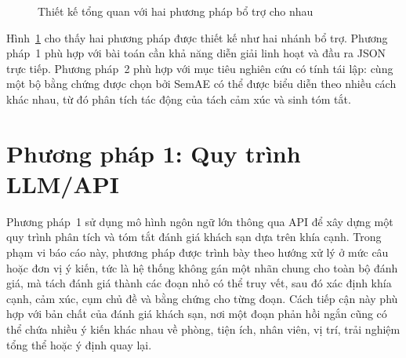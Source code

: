 \documentclass[12pt,a4paper]{report}
\begin{document}
\begin{figure}[tbp]
\centering
{}
\caption{Thiết kế tổng quan với hai phương pháp bổ trợ cho nhau}
\label{fig:two-method-overview}
\end{figure}

Hình~\ref{fig:two-method-overview} cho thấy hai phương pháp được thiết kế như hai nhánh bổ trợ. Phương pháp~1 phù hợp với bài toán cần khả năng diễn giải linh hoạt và đầu ra JSON trực tiếp. Phương pháp~2 phù hợp với mục tiêu nghiên cứu có tính tái lập: cùng một bộ bằng chứng được chọn bởi SemAE có thể được biểu diễn theo nhiều cách khác nhau, từ đó phân tích tác động của tách cảm xúc và sinh tóm tắt.

\section{Phương pháp 1: Quy trình LLM/API}

Phương pháp~1 sử dụng mô hình ngôn ngữ lớn thông qua API để xây dựng một quy trình phân tích và tóm tắt đánh giá khách sạn dựa trên khía cạnh. Trong phạm vi báo cáo này, phương pháp được trình bày theo hướng xử lý ở mức câu hoặc đơn vị ý kiến, tức là hệ thống không gán một nhãn chung cho toàn bộ đánh giá, mà tách đánh giá thành các đoạn nhỏ có thể truy vết, sau đó xác định khía cạnh, cảm xúc, cụm chủ đề và bằng chứng cho từng đoạn. Cách tiếp cận này phù hợp với bản chất của đánh giá khách sạn, nơi một đoạn phản hồi ngắn cũng có thể chứa nhiều ý kiến khác nhau về phòng, tiện ích, nhân viên, vị trí, trải nghiệm tổng thể hoặc ý định quay lại.
\end{document}
